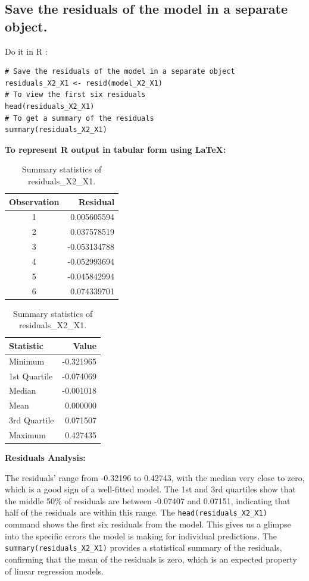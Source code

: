 \documentclass[12pt]{article}
\begin{document}
\newpage
\subsection{Save the residuals of the model in a separate object.}

Do it in R :
\begin{lstlisting}
# Save the residuals of the model in a separate object
residuals_X2_X1 <- resid(model_X2_X1)
# To view the first six residuals
head(residuals_X2_X1)
# To get a summary of the residuals
summary(residuals_X2_X1)
\end{lstlisting}
\newpage
\textbf{To represent R output in tabular form using LaTeX:}

\begin{table}[h!]
\centering
\begin{minipage}{.5\textwidth}
\centering
\begin{tabular}{|c|r|}
\hline
Observation & Residual \\
\hline
1 & 0.005605594 \\
2 & 0.037578519 \\
3 & -0.053134788 \\
4 & -0.052993694 \\
5 & -0.045842994 \\
6 & 0.074339701 \\
\hline
\end{tabular}
\caption{First six residuals of residuals\_X2\_X1.}
\label{tab:first_six_residuals}
\end{minipage}%
\begin{minipage}{.5\textwidth}
\centering
\begin{tabular}{|l|r|}
\hline
Statistic & Value \\
\hline
Minimum & -0.321965 \\
1st Quartile & -0.074069 \\
Median & -0.001018 \\
Mean & 0.000000 \\
3rd Quartile & 0.071507 \\
Maximum & 0.427435 \\
\hline
\end{tabular}
\caption{Summary statistics of residuals\_X2\_X1.}
\label{tab:summary_residuals}
\end{minipage}
\end{table}
\textbf{Residuals Analysis:}

The residuals' range from -0.32196 to 0.42743, with the median very close to zero, which is a good sign of a well-fitted model. The 1st and 3rd quartiles show that the middle 50\% of residuals are between -0.07407 and 0.07151, indicating that half of the residuals are within this range. The \texttt{head(residuals\_X2\_X1)} command shows the first six residuals from the model. This gives us a glimpse into the specific errors the model is making for individual predictions. The \texttt{summary(residuals\_X2\_X1)} provides a statistical summary of the residuals, confirming that the mean of the residuals is zero, which is an expected property of linear regression models.
\end{document}

